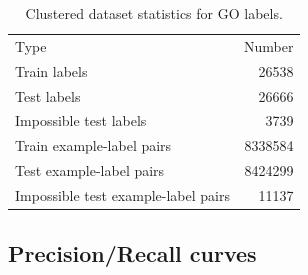 \begin{table}[htbp]
\centering
\begin{tabular}{|l|r|}
\hline
                                Type &   Number \\
\Xhline{2pt}
                        Train labels &    26538 \\
\hline
                         Test labels &    26666 \\
\hline
              Impossible test labels &     3739 \\
\hline
           Train example-label pairs &  8338584 \\
\hline
            Test example-label pairs &  8424299 \\
\hline
 Impossible test example-label pairs &    11137 \\
\hline
\end{tabular}
\caption{Clustered dataset statistics for GO labels.}
\end{table}
\pagebreak
\subsection{Precision/Recall curves}

